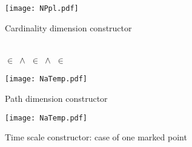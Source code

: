 \begin{figure}[H]
\small
\hfill%
\begin{minipage}[c]{0.4\textwidth}
\texttt{[image: NPpl.pdf]}
\end{minipage}
\caption{Cardinality dimension constructor \label{app:cardinality}}
\end{figure}

\begin{figure}[H]
\begin{minipage}{0.4\textwidth}
\\
\centering
{} $\in$  $\,\wedge\,$  $\in$  $\,\wedge\,$
 $\in$ 
\end{minipage}\hfill%
\hfill%
\texttt{[image: NaTemp.pdf]}
\caption{Path dimension constructor \label{app:path}}
\end{figure}

\begin{figure}[H]
\small
\begin{minipage}{0.42\textwidth}
\end{minipage}
\begin{minipage}{0.18\textwidth}
\end{minipage}
\begin{minipage}{0.35\textwidth}
\texttt{[image: NaTemp.pdf]}
\end{minipage}
\caption{Time scale constructor: case of one marked point \label{app:time}}
\end{figure}


